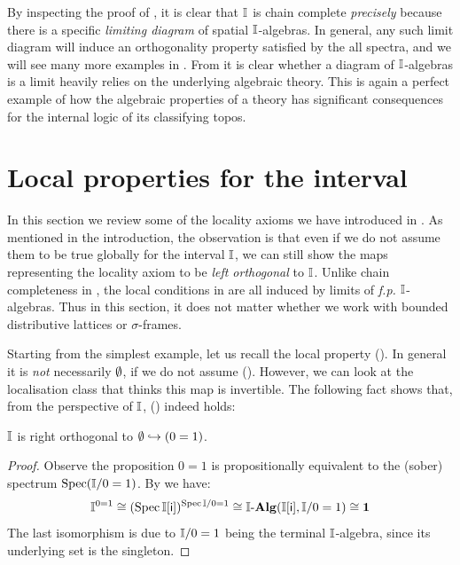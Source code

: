 \begin{remark}\label{rem:limofalgloc}
  By inspecting the proof of , it is clear that $\mathbb{I}$ is chain complete \emph{precisely} because there is a specific \emph{limiting diagram} of spatial $\mathbb{I}$-algebras. In general, any such limit diagram will induce an orthogonality property satisfied by the all spectra, and we will see many more examples in . From  it is clear whether a diagram of $\mathbb{I}$-algebras is a limit heavily relies on the underlying algebraic theory. This is again a perfect example of how the algebraic properties of a theory has significant consequences for the internal logic of its classifying topos.
\end{remark}

\section{Local properties for the interval}\label{sec:local}

In this section we review some of the locality axioms we have introduced in . As mentioned in the introduction, the observation is that even if we do not assume them to be true globally for the interval $\mathbb{I}$, we can still show the maps representing the locality axiom to be \emph{left orthogonal} to $\mathbb{I}$.  
Unlike chain completeness in , the local conditions in  are all induced by limits of \emph{f.p.} $\mathbb{I}$-algebras. Thus in this section, it does not matter whether we work with bounded distributive lattices or $\sigma$-frames.

Starting from the simplest example, let us recall the local property (\AxiomNT). In general it is \emph{not} necessarily $\emptyset$, if we do not assume (\AxiomNT). However, we can look at the localisation class that thinks this map is invertible. The following fact shows that, from the perspective of $\mathbb{I}$, (\AxiomNT) indeed holds:

\begin{proposition}[\AxiomSQCI]\label{specisnontrivial}
  $\mathbb{I}$ is right orthogonal to $\emptyset \hookrightarrow (0 = 1)$.
\end{proposition}
\begin{proof}
  Observe the proposition $0 = 1$ is propositionally equivalent to the (sober) spectrum $\operatorname{Spec}(\mathbb{I}/0=1)$. By  we have:
  \[ 
    \I^{0=1} \cong 
    (\spec \I[\ms{i}])^{\spec{\I/0=1}}
    \cong 
    \I\alg(\I[\ms{i}], \I/0=1) 
    \cong 
    \mathbf{1}
  \]
  The last isomorphism is due to $\mathbb{I}/0=1$ being the terminal $\mathbb{I}$-algebra, since its underlying set is the singleton.
\end{proof}

